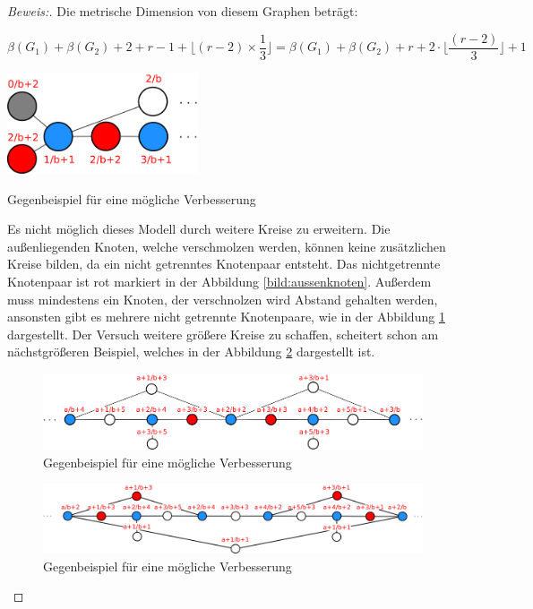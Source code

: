 \begin{proof}[Beweis:]
Die metrische Dimension von diesem Graphen beträgt:

$$ \beta(G_1)+\beta(G_2)+2+r-1+ \lfloor(r-2)\times\frac{1}{3}\rfloor = \beta(G_1)+\beta(G_2)+r+2 \cdot \lfloor\frac{(r-2)}{3}\rfloor+1$$

\newpage

	   	 
\begin{floatingfigure}[l]{200pt}
\centering
\includegraphics*[width = 160pt]{bilder/gbspver1.pdf}
\caption{Gegenbeispiel für eine mögliche Verbesserung}
\label{bild:aussenknoten}
\end{floatingfigure}
Es nicht möglich dieses Modell durch weitere Kreise zu erweitern. Die außenliegenden Knoten, welche verschmolzen werden, können keine zusätzlichen Kreise bilden, da ein nicht getrenntes Knotenpaar entsteht. Das nichtgetrennte Knotenpaar ist rot markiert in der Abbildung \ref{bild:aussenknoten}. Außerdem muss mindestens ein Knoten, der verschnolzen wird Abstand gehalten werden, ansonsten gibt es mehrere nicht getrennte Knotenpaare, wie in der Abbildung \ref{bild:2hintereinander} dargestellt. Der Versuch weitere größere Kreise zu schaffen, scheitert schon am nächstgrößeren Beispiel, welches in der Abbildung \ref{bild:multikreise} dargestellt ist.

 
 \begin{figure}[h!]
		\centering 		 
\includegraphics[width=420pt]{bilder/gbspver2.pdf}
   \caption{Gegenbeispiel für eine mögliche Verbesserung}
\label{bild:2hintereinander}  	 
  	 \end{figure}  


 \begin{figure}[h!]
		\centering 		 
\includegraphics[width=420pt]{bilder/gbsp3.pdf}
   \caption{Gegenbeispiel für eine mögliche Verbesserung}
\label{bild:multikreise}  	 
  	 \end{figure} 
\end{proof}

